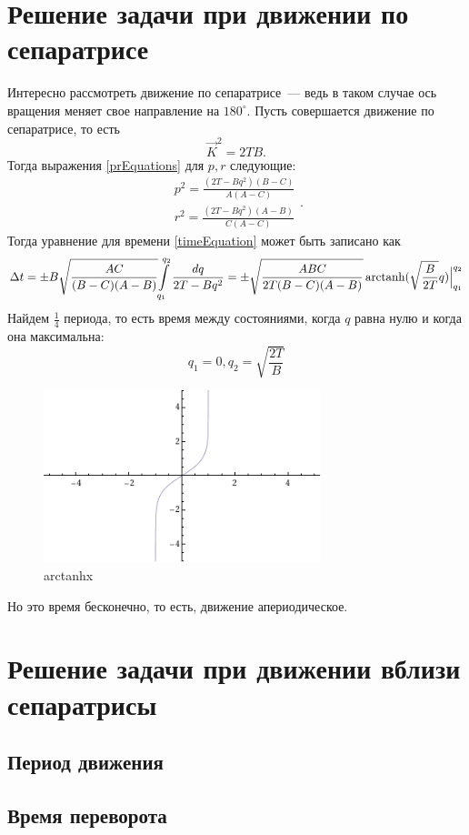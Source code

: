 \documentclass{article}
\DeclareMathOperator\arctanh{arctanh}
\newcommand{\degree}{^{\circ}}
\begin{document}
\section{Решение задачи при движении по сепаратрисе}
Интересно рассмотреть движение по сепаратрисе~--- ведь в таком случае ось вращения меняет свое направление на \begin{math}180\degree\end{math}.
Пусть совершается движение по сепаратрисе, то есть
\begin{equation}
\vec{K}^2=2TB.
\end{equation}
Тогда выражения \ref{prEquations} для \begin{math} p, r \end{math} следующие:
\begin{equation}
\begin{array}{l}
p^2=\frac{(2T-Bq^2)(B-C)}{A(A-C)}\\
r^2=\frac{(2T-Bq^2)(A-B)}{C(A-C)}
\end{array}.
\end{equation}
Тогда уравнение для времени \ref{timeEquation} может быть записано как
\begin{equation}
\Delta t=\pm B\sqrt{\frac{AC}{(B-C)(A-B)}}{\int\limits_{q_1}^{q_2}\frac{dq}{2T-Bq^2}}=
\pm\sqrt{\frac{ABC}{2T(B-C)(A-B)}}\arctanh(\sqrt{\frac{B}{2T}}q)\Bigl|_{q_1}^{q_2}
\end{equation}
Найдем \begin{math} \frac{1}{4} \end{math} периода, то есть время между состояниями, когда \begin{math} q \end{math} равна нулю и когда она максимальна:
\begin{equation}
q_1=0, q_2=\sqrt{\frac{2T}{B}}
\end{equation}
\begin{figure}[h]
\includegraphics[height=5cm]{ArcTanh}
\caption{arctanhx}
\end{figure}
Но это время бесконечно, то есть, движение апериодическое.
\section{Решение задачи при движении вблизи сепаратрисы}
\subsection{Период движения}
\subsection{Время переворота}
\end{document}

